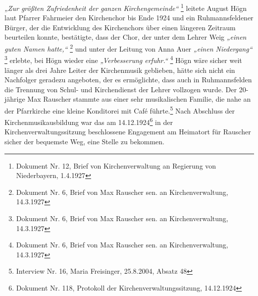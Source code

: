 \documentclass[a4paper]{article}
\newcommand\textstyleZitate[1]{\textit{#1}}
\begin{document}
\textstyleZitate{„Zur größten Zufriedenheit der ganzen Kirchengemeinde“
}\footnote{ Dokument Nr. 12, Brief von Kirchenverwaltung an Regierung
von Niederbayern, 1.4.1927} leitete August Högn laut Pfarrer Fahrmeier
den Kirchenchor bis Ende 1924 und ein Ruhmannsfeldener Bürger, der die
Entwicklung des Kirchenchors über einen längeren Zeitraum beurteilen
konnte, bestätigte, dass der Chor, der unter dem Lehrer Weig
\textstyleZitate{„einen guten Namen hatte,“ }\footnote{ Dokument Nr. 6,
Brief von Max Rauscher sen. an Kirchenverwaltung, 14.3.1927} und unter
der Leitung von Anna Auer \textstyleZitate{„einen Niedergang“
}\footnote{ Dokument Nr. 6, Brief von Max Rauscher sen. an
Kirchenverwaltung, 14.3.1927} erlebte, bei Högn wieder eine
\textstyleZitate{„Verbesserung erfuhr.“ }\footnote{ Dokument Nr. 6,
Brief von Max Rauscher sen. an Kirchenverwaltung, 14.3.1927} Högn wäre
sicher weit länger als drei Jahre Leiter der Kirchenmusik geblieben,
hätte sich nicht ein Nachfolger geradezu angeboten, der es ermöglichte,
dass auch in Ruhmannsfelden die Trennung von Schul- und Kirchendienst
der Lehrer vollzogen wurde. Der 20-jährige Max Rauscher stammte aus
einer sehr musikalischen Familie, die nahe an der Pfarrkirche eine
kleine Konditorei mit Café führte.\footnote{ Interview Nr. 16, Maria
Freisinger, 25.8.2004, Absatz 48} Nach Abschluss der
Kirchenmusikausbildung war das am 14.12.1924\footnote{ Dokument Nr.
118, Protokoll der Kirchenverwaltungssitzung, 14.12.1924} in der
Kirchenverwaltungssitzung beschlossene Engagement am Heimatort für
Rauscher sicher der bequemste Weg, eine Stelle zu bekommen.
\end{document}
